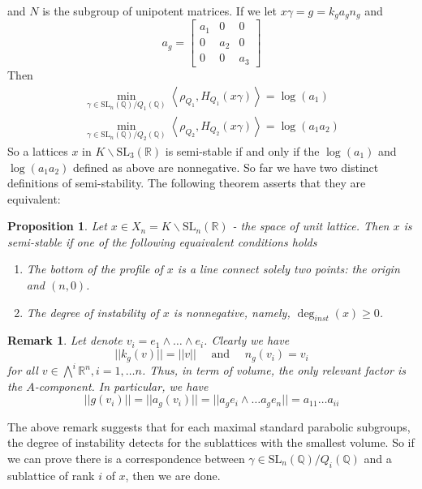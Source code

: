 \documentclass[12pt]{article} %
\newtheorem{prop}[definition]{Proposition}
\newtheorem*{remark}{Remark}
\begin{document}
and $N$ is the subgroup of unipotent matrices. If we let $ x\gamma = g = k_ga_gn_g$ and
\[a_g = \begin{bmatrix}
        a_1 & 0   & 0   \\
        0   & a_2 & 0   \\
        0   & 0   & a_3
    \end{bmatrix}\]
Then
\begin{align*}
    \min_{\gamma \in \text{SL}_n(\mathbb{Q})/Q_1(\mathbb{Q})}\left\langle \rho_{Q_1}, H_{Q_1}(x\gamma) \right\rangle = \log(a_1) \\ \min_{\gamma \in \text{SL}_n(\mathbb{Q})/Q_2(\mathbb{Q})}\left\langle \rho_{Q_2}, H_{Q_2}(x\gamma) \right\rangle = \log(a_1a_2)
\end{align*}
So a lattices $x$ in $K \backslash\text{SL}_3(\mathbb{R})$  is semi-stable if and only if the $\log(a_1)$ and $\log(a_1a_2)$ defined as above are nonnegative.
So far we have two distinct definitions of semi-stability. The following theorem asserts that they are equivalent:
\begin{prop}
    Let $x \in X_n = K \backslash \text{SL}_n(\mathbb{R})$ - the space of unit lattice. Then $x$ is semi-stable if one of the following equaivalent
    conditions holds
    \begin{enumerate}
        \item The bottom of the profile of $x$ is a line connect solely two points: the origin and $(n,0)$.
        \item The degree of instability of $x$ is nonnegative, namely, $\deg_{inst}(x) \ge 0$.
    \end{enumerate}
\end{prop}
\begin{remark}
    Let denote $v_i = e_1 \wedge \ldots \wedge e_i$. Clearly we have
    \[||k_g(v)|| = ||v|| \quad \text{ and } \quad n_g(v_i) =v_i\]
    for all $v \in \bigwedge^i \mathbb{R}^n, i = 1,\ldots n$. Thus, in term of volume, the only
    relevant factor is the $A$-component. In particular, we have
    \[||g(v_i)|| =||a_g(v_i)|| = ||a_ge_i\wedge \ldots a_ge_n|| = a_{11}\ldots a_{ii} \]
\end{remark}
The above remark suggests that for each maximal standard parabolic subgroups, the degree of instability detects
for the sublattices with the smallest volume. So if we can prove there is a correspondence between
$\gamma \in \text{SL}_n(\mathbb{Q})/Q_i(\mathbb{Q})$ and a sublattice of rank $i$ of $x$, then we are done.
\end{document}

